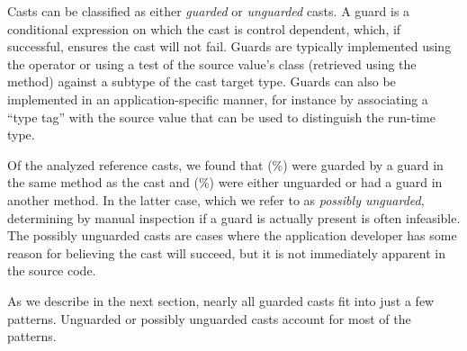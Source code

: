 Casts can be classified as either \emph{guarded} or \emph{unguarded} casts.
A guard is a conditional expression on which the cast is control dependent,
which, if successful, ensures the cast will not fail.
Guards are typically implemented using the  operator or using
a test of the source value's class (retrieved using the
 method) against a subtype of the cast target type.
Guards can also be implemented in an application-specific manner, for instance
by associating a ``type tag'' with the source value that can be used to
distinguish the run-time type.

Of the \nReference{} analyzed reference casts,
we found that \nGuarded{} (\pGuarded\%) were guarded by a
guard in the same method as the cast and \nUnguarded{} (\pUnguarded\%)
were either unguarded or had a guard in another method.
In the latter case, which we refer to as \emph{possibly unguarded},
determining by manual inspection if a guard is actually
present is often infeasible. The possibly unguarded casts are cases where the application developer
has some reason for believing the cast will succeed, but it is not immediately
apparent in the source code.

As we describe in the next section, nearly all guarded casts fit into just a
few patterns. Unguarded or possibly unguarded casts account for most of the
patterns.
